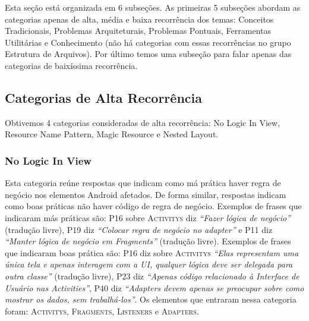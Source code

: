 Esta se\c{c}\~ao est\'a organizada em 6 subse\c{c}\~oes. As primeiras 5 subse\c{c}\~oes abordam as categorias apenas de alta, m\'edia e baixa recorr\^encia dos temas: Conceitos Tradicionais, Problemas Arquiteturais, Problemas Pontuais, Ferramentas Utilit\'arias e Conhecimento (n\~ao h\'a categorias com essas recorr\^encias no grupo Estrutura de Arquivos). Por \'ultimo temos uma subse\c{c}\~ao para falar apenas das categorias de baix\'issima recorr\^encia.

\subsection{Categorias de Alta Recorr\^encia}
Obtivemos 4 categorias consideradas de alta recorr\^encia: No Logic In View, Resource Name Pattern, Magic Resource e Nested Layout.

\subsubsection{No Logic In View}
Esta categoria re\'une respostas que indicam como m\'a pr\'atica haver regra de neg\'ocio nos elementos Android afetados. De forma similar, respostas indicam como boas pr\'aticas n\~ao haver c\'odigo de regra de neg\'ocio. Exemplos de frases que indicaram m\'as pr\'aticas s\~ao: P16 sobre \textsc{Activitys} diz \textit{``Fazer l\'ogica de neg\'ocio''} (tradu\c{c}\~ao livre), P19 diz \textit{``Colocar regra de neg\'ocio no adapter''} e P11 diz \textit{``Manter l\'ogica de neg\'ocio em Fragments''} (tradu\c{c}\~ao livre). Exemplos de frases que indicaram boas pr\'atica s\~ao: P16 diz sobre \textsc{Activitys} \textit{``Elas representam uma \'unica tela e apenas interagem com a UI, qualquer l\'ogica deve ser delegada para outra classe''} (tradu\c{c}\~ao livre), P23 diz \textit{``Apenas c\'odigo relacionado \`a Interface de Usu\'ario nas Activities''}, P40 diz \textit{``Adapters devem apenas se preocupar sobre como mostrar os dados, sem trabalh\'a-los''}. Os elementos que entraram nessa categoria foram: \textsc{Activitys}, \textsc{Fragments}, \textsc{Listeners} e \textsc{Adapters}. 


